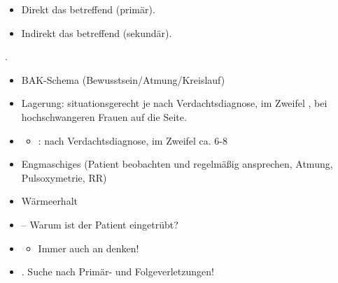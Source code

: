 {
\begin{itemize}
  \item Direkt das  betreffend (primär).
  \item Indirekt das  betreffend (sekundär).
\end{itemize}

.
}{}{}{}











{}{ 

\begin{itemize}
  \item BAK-Schema  (Bewusstsein/Atmung/Kreislauf)
  \item Lagerung: situationsgerecht je nach
  Verdachtsdiagnose, im Zweifel , bei hochschwangeren Frauen auf die
   Seite.
  \item \TxBeiVit \TxMassVitBes
  
  \begin{itemize}
    \item {}: nach Verdachtsdiagnose, im Zweifel
    ca. 6-8\LMin
  \end{itemize}
  
  \item Engmaschiges  (Patient
  beobachten und regelmäßig ansprechen, Atmung,
  Pulsoxymetrie, RR)
  \item Wärmeerhalt
  \item {} -- Warum ist der
  Patient eingetrübt?
  \item {}
  \begin{itemize}
    \item Immer auch an  denken!
  \end{itemize}
  \item {}. Suche nach Primär- und
  Folgeverletzungen!
\end{itemize}

}

